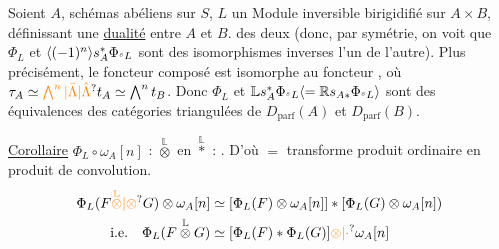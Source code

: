   Soient $A$,   schémas abéliens sur $S$,  $L$ un Module inversible birigidifié sur $A\times B$, définissant une \uline{dualité} entre $A$ et $B$.   des deux
  (donc, par symétrie, on voit que $\Phi_L$ et $\inserted{(-1)^n}s_A^*\Phi_{{}^{s}L}$ sont des isomorphismes inverses l'un de l'autre).
Plus précisément, le foncteur composé
est  isomorphe au foncteur  ,  où $\tau_A\simeq\unsure{\bigwedge^{n}|\bar{\Lambda}|\hat{\Lambda}}t_A\simeq\bigwedge^{n}t_B$. Donc $\Phi_L$ et $\mathbb{L} s_A^*\Phi_{{}^{s}L}\inserted{=\mathbb{R} s_{A*}\Phi_{{}^{s}L}}$ sont des équivalences des catégories triangulées de $D_{\mathrm{parf}}(A)$ et $D_{\mathrm{parf}}(B)$.

\uline{Corollaire}  $\Phi_L\circ\omega_A[n]$ :   $\overset{\mathbb L}{\otimes}$ en $\overset{\mathbb L}{*}$ : . D'où $=$    transforme produit ordinaire en  produit de convolution.
\[
\begin{aligned}
\Phi_L(F\unsure{\overset{\mathbb L}{\otimes}|\otimes}G)\otimes\omega_A[n]&\simeq[\Phi_L(F)\otimes\omega_A[n]]*[\Phi_L(G)\otimes\omega_A[n])\\
\text{i.e.}\quad \Phi_L(F\overset{\mathbb L}{\otimes} G)&\simeq[\Phi_L(F)*\Phi_L(G)]\unsure{\otimes|\mathbin{\cdot}}\omega_A[n]
\end{aligned}
\]

